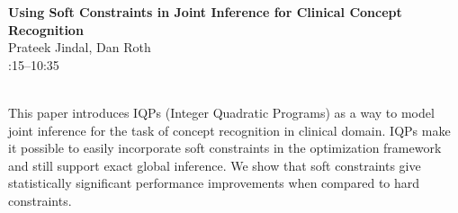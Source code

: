 \documentclass[twoside,makeidx]{book}
\renewcommand{\normalsize}{\fontsize{8}{9}\selectfont}
\renewcommand{\small}{\fontsize{7}{8}\selectfont}
\begin{document}
\par\vspace{2em}\noindent%
\begin{minipage}{\linewidth}%
\begin{center}
\textbf{\normalsize Using Soft Constraints in Joint Inference for Clinical Concept Recognition}\\
\normalsize  Prateek Jindal,  Dan Roth\\
{\small 10:15--10:35}\\
\end{center}
\end{minipage}\\[0.5em]
\nopagebreak%
\noindent%
{\small This paper introduces IQPs (Integer Quadratic Programs) as a way to model joint inference for the task of concept recognition in clinical domain. IQPs make it possible to easily incorporate soft constraints in the optimization framework and still support exact global inference. We show that soft constraints give statistically significant performance improvements when compared to hard constraints.}
\clearpage
\end{document}
